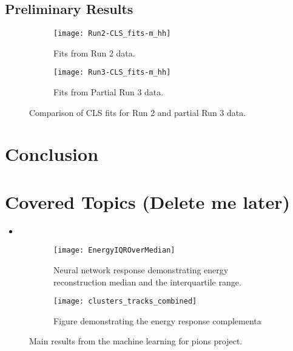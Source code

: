 \documentclass[12pt]{article}
\begin{document}
\lipsum[17-18]
\newpage
\clearpage

\subsection{Preliminary Results}
\begin{figure}[t]
    \centering
    \begin{subfigure}[t]{.48\textwidth}
        \centering
        \texttt{[image: Run2-CLS\_fits-m\_hh]}
        \caption{Fits from Run 2 data.}
        \label{subfig:cls-run2}
    \end{subfigure}
    \begin{subfigure}[t]{.48\textwidth}
        \centering
        \texttt{[image: Run3-CLS\_fits-m\_hh]}
        \caption{Fits from Partial Run 3 data.}
        \label{subfig:cls-run3}
    \end{subfigure}
\caption{Comparison of CLS fits for Run 2 and partial Run 3 data.}
\label{fig:cls_fit_results}
\end{figure}
\lipsum[20-21]

\section{Conclusion}
\lipsum[25]

\section{Covered Topics (Delete me later)}
\begin{itemize}
    \item 
\end{itemize}
\newpage

\begin{figure}[t]
    \centering
    \begin{subfigure}[t]{.48\textwidth}
        \centering
        \texttt{[image: EnergyIQROverMedian]}
        \caption{Neural network response demonstrating energy reconstruction
        median and the interquartile range.}
        \label{sufig:ml4p_energy_response}
    \end{subfigure}
    \hfill
    \begin{subfigure}[t]{.48\textwidth}
        \centering
        \texttt{[image: clusters\_tracks\_combined]}
        \caption{Figure demonstrating the energy response complementa}
        \label{subfig:complimentarity}
    \end{subfigure}
\caption{Main results from the machine learning for pions project.}
\label{fig:ml4p_main_results.}
\end{figure}
\end{document}
